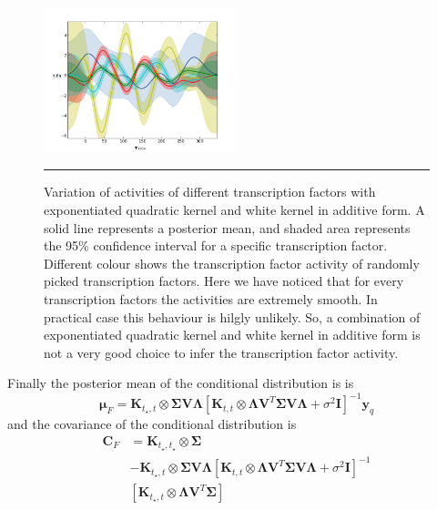 \begin{figure}[!htbp]
	\centering
	\includegraphics[width=0.5\textwidth,keepaspectratio]{diagrams/RBFWh9TF.png}
	\rule{25em}{0.5pt}
	\caption[Variation of activities of transcription factors with exponentiated quadratic kernel and white kernel in additive form] {Variation of activities of different transcription factors with exponentiated quadratic kernel and white kernel in additive form. A solid line represents a posterior mean, and shaded area represents the 95\% confidence interval for a specific transcription factor. Different colour shows the transcription factor activity of randomly picked transcription factors. Here we have noticed that for every transcription factors the activities are extremely smooth. In practical case this behaviour is hilgly unlikely. So, a combination of exponentiated quadratic kernel and white kernel in additive form is not a very good choice to infer the transcription factor activity.}
	\label{fig:TFA_with_RBFnWhKernel}
\end{figure}
Finally the posterior mean of the conditional distribution  is %
is
\begin{equation} \label{eq:prediction_MuF}
\boldsymbol{\mu}_F = 
\mathbf{K}_{t_\star,t} \otimes \boldsymbol{\Sigma} \mathbf{V} \boldsymbol{\Lambda}
\left[ \mathbf{K}_{t,t} \otimes \boldsymbol{\Lambda} \mathbf{V}^T\boldsymbol{\Sigma} \mathbf{V} \boldsymbol{\Lambda} + \sigma^2 \mathbf{I} \right]^{-1}\mathbf{y}_q
\end{equation}
and the covariance of the conditional distribution is %
\begin{equation} \label{eq:prediction_CF}
\begin{split}
\boldsymbol{C}_F &= 
\mathbf{K}_{t_\star,t_\star} \otimes \boldsymbol{\Sigma} \\
& - \mathbf{K}_{t_\star,t} \otimes \boldsymbol{\Sigma}\mathbf{V} \boldsymbol{\Lambda}
\left[ \mathbf{K}_{t,t} \otimes \boldsymbol{\Lambda} \mathbf{V}^T\boldsymbol{\Sigma} \mathbf{V} \boldsymbol{\Lambda} + \sigma^2 \mathbf{I} \right]^{-1} \\
& \left[ \mathbf{K}_{t_\star,t} \otimes \boldsymbol{\Lambda} \mathbf{V}^T\boldsymbol{\Sigma}\right]
\end{split}
\end{equation}
